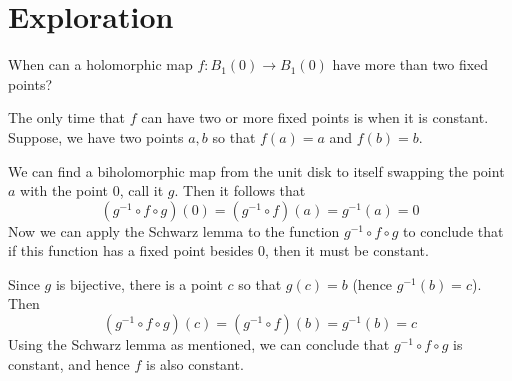 \documentclass{homework}
\begin{document}
                                                                        \section{Exploration}

                                                                        \begin{problem}  
                                                                          When can a holomorphic map $f : B_1(0) \to B_1(0)$ have more than two fixed points?
                                                                          \end{problem}
                                                                          \begin{solution}
                                                                          The only time that $f$ can have two or more fixed points is when it is constant. Suppose, we have two points $a,b$ so that $f(a)=a$ and $f(b)=b.$

                                                                          We can find a biholomorphic map from the unit disk to itself swapping the point $a$ with the point $0$, call it $g$. Then it follows that 
                                                                          \[
                                                                          (g^{-1}\circ f \circ g)(0) = (g^{-1}\circ f)(a) = g^{-1}(a) = 0
                                                                          \]
                                                                          Now we can apply the Schwarz lemma to the function $g^{-1}\circ f \circ g$ to conclude that if this function has a fixed point besides 0, then it must be constant.

                                                                          Since $g$ is bijective, there is a point $c$ so that $g(c)=b$ (hence $g^{-1}(b)= c$). Then
                                                                          \[
                                                                          (g^{-1}\circ f \circ g)(c) = (g^{-1}\circ f)(b) = g^{-1}(b) = c
                                                                          \]
                                                                          Using the Schwarz lemma as mentioned, we can conclude that $g^{-1}\circ f\circ g$ is constant, and hence $f$ is also constant.
                                                                          \end{solution}
\end{document}
